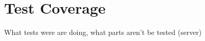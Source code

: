 
\chapter{Test Coverage} %

\label{Part9Chapter8} %


What tests were are doing, what parts aren't be tested (server)